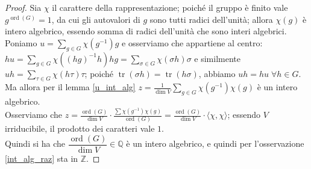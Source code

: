 \documentclass[11pt]{article}
\theoremstyle{plain}
\theoremstyle{definition}
\theoremstyle{remark}
\newcommand{\Q}{\mathbb{Q}}
\newcommand{\Z}{\mathbb{Z}}
\DeclareMathOperator{\tr}{tr}
\DeclareMathOperator{\ord}{ord}
\begin{document}
  \begin{proof}
   Sia $\chi$ il carattere della rappresentazione; poiché il gruppo è finito vale $g^{\ord(G)}=1$, da cui gli autovalori di $g$ sono tutti radici dell'unità; allora $\chi(g)$ è intero algebrico, essendo somma di radici dell'unità che sono interi algebrici.\\
   Poniamo $\displaystyle u=\sum_{g\in G}\chi(g^{-1})g$ e osserviamo che appartiene al centro: $\displaystyle hu=\sum_{g\in G} \chi((hg)^{-1}h)hg=\sum_{\sigma\in G} \chi(\sigma h)\sigma$ e similmente $\displaystyle uh=\sum_{\tau\in G}\chi(h\tau)\tau$; poiché $\tr(\sigma h)=\tr(h\sigma)$, abbiamo $uh=hu\;\forall h\in G$.\\
   Ma allora per il lemma \ref{u_int_alg} $z=\displaystyle\frac1{\dim V}\sum_{g\in G}\chi(g^{-1})\chi(g)$ è un intero algebrico.\\
   Osserviamo che $\displaystyle z=\frac{\ord(G)}{\dim V}\cdot \frac{\sum \chi(g^{-1})\chi(g)}{\ord(G)}=\frac{\ord(G)}{\dim V}\cdot\langle \chi,\chi\rangle$; essendo $V$ irriducibile, il prodotto dei caratteri vale $1$.\\
   Quindi si ha che $\dfrac{\ord(G)}{\dim V}\in\Q$ è un intero algebrico, e quindi per l'osservazione \ref{int_alg_raz} sta in $\Z$.
  \end{proof}
\end{document}
